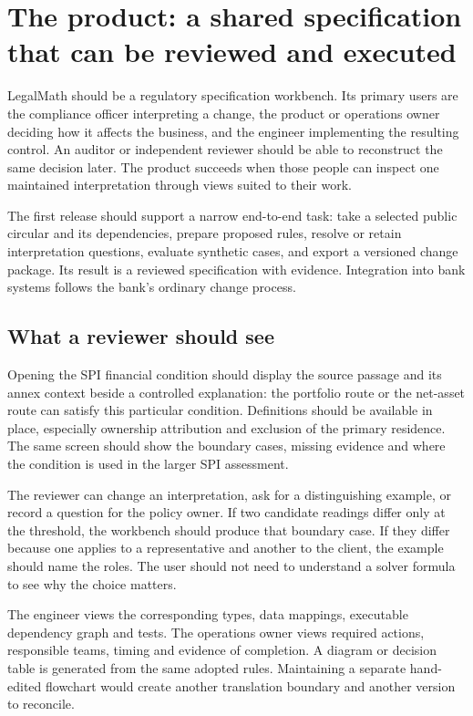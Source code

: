 \section{The product: a shared specification that can be reviewed and executed}
\label{sec:product}

LegalMath should be a regulatory specification workbench. Its primary users are
the compliance officer interpreting a change, the product or operations owner
deciding how it affects the business, and the engineer implementing the resulting
control. An auditor or independent reviewer should be able to reconstruct the
same decision later. The product succeeds when those people can inspect one
maintained interpretation through views suited to their work.

The first release should support a narrow end-to-end task: take a selected public
circular and its dependencies, prepare proposed rules, resolve or retain
interpretation questions, evaluate synthetic cases, and export a versioned change
package. Its result is a reviewed specification with evidence. Integration into
bank systems follows the bank's ordinary change process.

\subsection{What a reviewer should see}

Opening the SPI financial condition should display the source passage and its
annex context beside a controlled explanation: the portfolio route or the
net-asset route can satisfy this particular condition. Definitions should be
available in place, especially ownership attribution and exclusion of the primary
residence. The same screen should show the boundary cases, missing evidence and
where the condition is used in the larger SPI assessment.

The reviewer can change an interpretation, ask for a distinguishing example, or
record a question for the policy owner. If two candidate readings differ only at
the threshold, the workbench should produce that boundary case. If they differ
because one applies to a representative and another to the client, the example
should name the roles. The user should not need to understand a solver formula
to see why the choice matters.

The engineer views the corresponding types, data mappings, executable dependency
graph and tests. The operations owner views required actions, responsible teams,
timing and evidence of completion. A diagram or decision table is generated from
the same adopted rules. Maintaining a separate hand-edited flowchart would create
another translation boundary and another version to reconcile.

